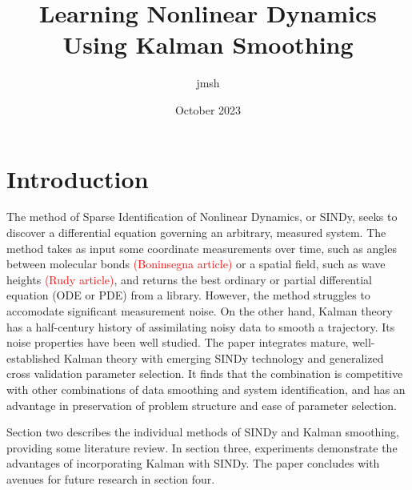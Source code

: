 \documentclass{article}
\title{Learning Nonlinear Dynamics Using Kalman Smoothing}
\author{jmsh}
\date{October 2023}
\newcommand{\red}[1]{\textcolor{red}{#1}}
\begin{document}
\maketitle


\section{Introduction}
The method of Sparse Identification of Nonlinear Dynamics, or SINDy, seeks to discover a differential equation governing an arbitrary, measured system.  The method takes as input some coordinate measurements over time, such as angles between molecular bonds \red{(Boninsegna article)} or a spatial field, such as wave heights \red{(Rudy article)}, and returns the best ordinary or partial differential equation (ODE or PDE) from a library.  However, the method struggles to accomodate significant measurement noise.  On the other hand, Kalman theory has a half-century history of assimilating noisy data to smooth a trajectory.  Its noise properties have been well studied. The paper integrates mature, well-established Kalman theory with emerging SINDy technology and generalized cross validation parameter selection.  It finds that the combination is competitive with other combinations of data smoothing and system identification, and has an advantage in preservation of problem structure and ease of parameter selection.

Section two describes the individual methods of SINDy and Kalman smoothing, providing some literature review.  In section three, experiments demonstrate the advantages of incorporating Kalman with SINDy.  The paper concludes with avenues for future research in section four.
\end{document}
